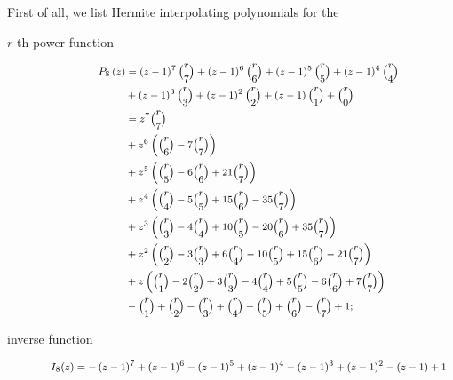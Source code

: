 First of all, we list Hermite interpolating polynomials for the
\begin{description}
\item[$r$-th power function]
\begin{displaymath}
\footnotesize
    \begin{split}
        P_{8}\left (z \right )  &= \left(z - 1\right)^{7} {\binom{r}{7}} + \left(z - 1\right)^{6} {\binom{r}{6}} + \left(z - 1\right)^{5} {\binom{r}{5}} + \left(z - 1\right)^{4} {\binom{r}{4}}\\
                            &+ \left(z - 1\right)^{3} {\binom{r}{3}} + \left(z - 1\right)^{2} {\binom{r}{2}} + \left(z - 1\right) {\binom{r}{1}} + {\binom{r}{0}} \\
                            &= z^{7} {\binom{r}{7}} \\
                            &+ z^{6} \left({\binom{r}{6}} - 7 {\binom{r}{7}}\right) \\
                            &+ z^{5} \left({\binom{r}{5}} - 6 {\binom{r}{6}} + 21 {\binom{r}{7}}\right) \\
                            &+ z^{4} \left({\binom{r}{4}} - 5 {\binom{r}{5}} + 15 {\binom{r}{6}} - 35 {\binom{r}{7}}\right) \\
                            &+ z^{3} \left({\binom{r}{3}} - 4 {\binom{r}{4}} + 10 {\binom{r}{5}} - 20 {\binom{r}{6}} + 35 {\binom{r}{7}}\right) \\
                            &+ z^{2} \left({\binom{r}{2}} - 3 {\binom{r}{3}} + 6 {\binom{r}{4}} - 10 {\binom{r}{5}} + 15 {\binom{r}{6}} - 21 {\binom{r}{7}}\right) \\
                            &+ z \left({\binom{r}{1}} - 2 {\binom{r}{2}} + 3 {\binom{r}{3}} - 4 {\binom{r}{4}} + 5 {\binom{r}{5}} - 6 {\binom{r}{6}} + 7 {\binom{r}{7}}\right) \\
                            &- {\binom{r}{1}} + {\binom{r}{2}} - {\binom{r}{3}} + {\binom{r}{4}} - {\binom{r}{5}} + {\binom{r}{6}} - {\binom{r}{7}} + 1;
    \end{split}
\end{displaymath}
\item[inverse function]
\begin{displaymath}
\footnotesize
    \begin{split} 
        I_{8}{\left (z \right )} &= - \left(z - 1\right)^{7} + \left(z - 1\right)^{6} - \left(z - 1\right)^{5} + \left(z - 1\right)^{4} - \left(z - 1\right)^{3} + \left(z - 1\right)^{2} - (z-1) + 1\\

\end{split}
\end{displaymath}
\end{description}
